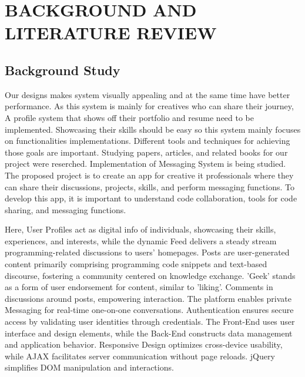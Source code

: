 \chapter{BACKGROUND AND LITERATURE REVIEW}





\section{Background Study}

Our designs makes system visually appealing and at the same time have better performance. As this system is mainly for creatives who can share their journey, A profile system that shows off their portfolio and resume need to be implemented. Showcasing their skills should be easy so this system mainly focuses on functionalities implementations. Different tools and techniques for achieving those goals are important. Studying papers, articles, and related books for our project were reserched. Implementation of Messaging System is being studied.
The proposed project is to create an app for creative it professionals where they can share their discussions, projects, skills, and perform messaging functions. To develop this app, it is important to understand code collaboration, tools for code sharing, and messaging functions.

Here, User Profiles act as digital info of individuals, showcasing their skills, experiences, and interests, while the dynamic Feed delivers a steady stream programming-related discussions to users' homepages. Posts are user-generated content primarily comprising programming code snippets and text-based discourse, fostering a community centered on knowledge exchange. 'Geek' stands as a form of user endorsement for content, similar to 'liking'. Comments in discussions around posts, empowering interaction. The platform enables private Messaging for real-time one-on-one conversations. Authentication ensures secure access by validating user identities through credentials. The Front-End uses user interface and design elements, while the Back-End constructs data management and application behavior. Responsive Design optimizes cross-device usability, while AJAX facilitates server communication without page reloads. jQuery simplifies DOM manipulation and interactions.

